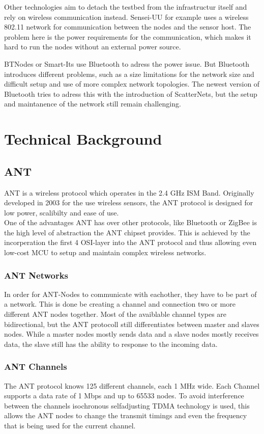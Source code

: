 Other technologies aim to detach the testbed from the infrastructur itself and rely on wireless communication instead. Sensei-UU \cite{Rensfelt2009} for example uses a wireless 802.11 network for communication between the nodes and the sensor host. The problem here is the power requirements for the communication, which makes it hard to run the nodes without an external power source.

BTNodes \cite{Moser} or Smart-Its \cite{Kasten2000} use Bluetooth to adress the power issue. But Bluetooth introduces different problems, such as a size limitations for the network size and difficult setup and use of more complex network topologies. The newest version of Bluetooth tries to adress this with the introduction of ScatterNets, but the setup and maintanence of the network still remain challenging.

\chapter{Technical Background}
\section{ANT}
ANT \cite{DynastreamInnovationsInc.2013} is a wireless protocol which operates in the 2.4 GHz ISM Band. Originally developed in 2003 for the use wireless sensors, the ANT protocol is designed for low power, scalibilty and ease of use.\\
One of the advantages ANT has over other protocols, like Bluetooth or ZigBee is the high level of abstraction the ANT chipset provides. This is achieved by the incorperation the first 4 OSI-layer into the ANT protocol and thus allowing even low-cost MCU to setup and maintain complex wireless networks.\\

\subsection{ANT Networks}
In order for ANT-Nodes to communicate with eachother, they have to be part of a network. This is done be creating a channel and connection two or more different ANT nodes together. Most of the avaiblable channel types are bidirectional, but the ANT protocoll still differentiates between master and slaves nodes. While a master nodes mostly sends data and a slave nodes mostly receives data, the slave still has the ability to response to the incoming data.

\subsection{ANT Channels}
The ANT protocol knows 125 different channels, each 1 MHz wide. Each Channel supports a data rate of 1 Mbps and up to 65533 nodes. To avoid interference between the channels isochronous selfadjusting TDMA technology is used, this allows the ANT nodes to change the transmit timings and even the frequency that is being used for the current channel.

